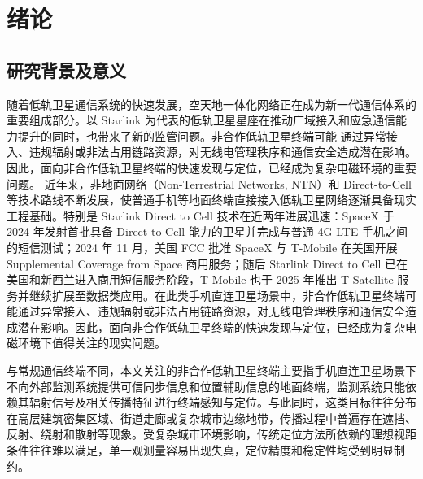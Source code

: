 \chapter{绪论}
\label{ch:introduction}

\section{研究背景及意义}
\label{sec:1_1}

随着低轨卫星通信系统的快速发展，空天地一体化网络正在成为新一代通信体系的重要组成部分。以 Starlink 为代表的低轨卫星星座在推动广域接入和应急通信能力提升的同时，也带来了新的监管问题\cite{Stock2025LEOPNTSurvey,Fan2024MassiveSoOP,Kozhaya2025StarlinkPNT,Kassas2023MultiConstellationLEO}。非合作低轨卫星终端可能
通过异常接入、违规辐射或非法占用链路资源，对无线电管理秩序和通信安全造成潜在影响。因此，面向非合作低轨卫星终端的快速发现与定位，已经成为复杂电磁环境的重要问题。
近年来，非地面网络（Non-Terrestrial Networks, NTN）和 Direct-to-Cell 等技术路线不断发展，使普通手机等地面终端直接接入低轨卫星网络逐渐具备现实工程基础\cite{Lin2021NTN,He2024DirectSmartphone,GarciaCabeza2025DirectToCell}。特别是 Starlink Direct to Cell 技术在近两年进展迅速：SpaceX 于 2024 年发射首批具备 Direct to Cell 能力的卫星并完成与普通 4G LTE 手机之间的短信测试；2024 年 11 月，美国 FCC 批准 SpaceX 与 T-Mobile 在美国开展 Supplemental Coverage from Space 商用服务；随后 Starlink Direct to Cell 已在美国和新西兰进入商用短信服务阶段，T-Mobile 也于 2025 年推出 T-Satellite 服务并继续扩展至数据类应用\cite{StarlinkDirectToCellFirstText2024,FCCSpaceXSCS2024,StarlinkDirectToCellService2025,TMobileTSatelliteLaunch2025,TMobileTSatelliteApps2025}。在此类手机直连卫星场景中，非合作低轨卫星终端可能通过异常接入、违规辐射或非法占用链路资源，对无线电管理秩序和通信安全造成潜在影响。因此，面向非合作低轨卫星终端的快速发现与定位，已经成为复杂电磁环境下值得关注的现实问题\cite{Yin2025LEO}。

与常规通信终端不同，本文关注的非合作低轨卫星终端主要指手机直连卫星场景下不向外部监测系统提供可信同步信息和位置辅助信息的地面终端，监测系统只能依赖其辐射信号及相关传播特征进行终端感知与定位\cite{Stock2025LEOPNTSurvey,Humphreys2023StarlinkSignal,Torrieri1984PassiveLocation,Weiss2011DirectGeolocation}。与此同时，这类目标往往分布在高层建筑密集区域、街道走廊或复杂城市边缘地带，传播过程中普遍存在遮挡、反射、绕射和散射等现象。受复杂城市环境影响，传统定位方法所依赖的理想视距条件往往难以满足，单一观测量容易出现失真，定位精度和稳定性均受到明显制约\cite{TR38901,Guvenc2009TOASurvey,Wang2013TDOANLOS,deSousa2018NLOSRayTracing}。

